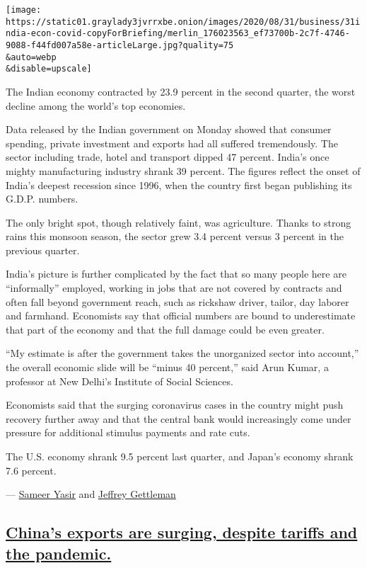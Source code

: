 \texttt{[image: https://static01.graylady3jvrrxbe.onion/images/2020/08/31/business/31india-econ-covid-copyForBriefing/merlin\_176023563\_ef73700b-2c7f-4746-9088-f44fd007a58e-articleLarge.jpg?quality=75\\\&auto=webp\\\&disable=upscale]}

The Indian economy contracted by 23.9 percent in the second quarter, the
worst decline among the world's top economies.

Data released by the Indian government on Monday showed that consumer
spending, private investment and exports had all suffered tremendously.
The sector including trade, hotel and transport dipped 47 percent.
India's once mighty manufacturing industry shrank 39 percent. The
figures reflect the onset of India's deepest recession since 1996, when
the country first began publishing its G.D.P. numbers.

The only bright spot, though relatively faint, was agriculture. Thanks
to strong rains this monsoon season, the sector grew 3.4 percent versus
3 percent in the previous quarter.

India's picture is further complicated by the fact that so many people
here are ``informally'' employed, working in jobs that are not covered
by contracts and often fall beyond government reach, such as rickshaw
driver, tailor, day laborer and farmhand. Economists say that official
numbers are bound to underestimate that part of the economy and that the
full damage could be even greater.

``My estimate is after the government takes the unorganized sector into
account,'' the overall economic slide will be ``minus 40 percent,'' said
Arun Kumar, a professor at New Delhi's Institute of Social Sciences.

Economists said that the surging coronavirus cases in the country might
push recovery further away and that the central bank would increasingly
come under pressure for additional stimulus payments and rate cuts.

The U.S. economy shrank 9.5 percent last quarter, and Japan's economy
shrank 7.6 percent.

--- \href{https://www.nytimes3xbfgragh.onion/by/sameer-yasir}{Sameer
Yasir} and
\href{https://www.nytimes3xbfgragh.onion/by/jeffrey-gettleman}{Jeffrey
Gettleman}

\hypertarget{chinas-exports-are-surging-despite-tariffs-and-the-pandemic}{%
\subsection{\texorpdfstring{\protect\hyperlink{chinas-exports-are-surging-despite-tariffs-and-the-pandemic}{China's
exports are surging, despite tariffs and the
pandemic.}}{China's exports are surging, despite tariffs and the pandemic.}}\label{chinas-exports-are-surging-despite-tariffs-and-the-pandemic}}

